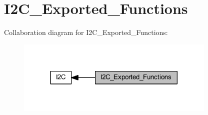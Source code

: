 \hypertarget{group___i2_c___exported___functions}{}\section{I2\+C\+\_\+\+Exported\+\_\+\+Functions}
\label{group___i2_c___exported___functions}
Collaboration diagram for I2\+C\+\_\+\+Exported\+\_\+\+Functions\+:
\nopagebreak
\begin{figure}[H]
\begin{center}
\leavevmode
\includegraphics[width=270pt]{group___i2_c___exported___functions}
\end{center}
\end{figure}
